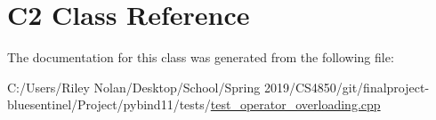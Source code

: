 \hypertarget{class_c2}{}\section{C2 Class Reference}
\label{class_c2}


The documentation for this class was generated from the following file\+:\begin{DoxyCompactItemize}
\item 
C\+:/\+Users/\+Riley Nolan/\+Desktop/\+School/\+Spring 2019/\+C\+S4850/git/finalproject-\/bluesentinel/\+Project/pybind11/tests/\mbox{\hyperlink{test__operator__overloading_8cpp}{test\+\_\+operator\+\_\+overloading.\+cpp}}\end{DoxyCompactItemize}
